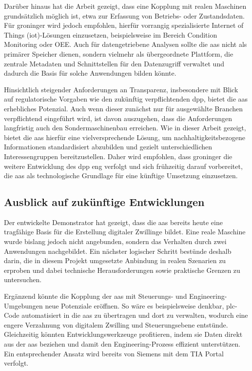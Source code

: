 Darüber hinaus hat die Arbeit gezeigt, dass eine Kopplung mit realen Maschinen grundsätzlich möglich ist, etwa zur Erfassung von Betriebs- oder Zustandsdaten. 
Für groninger wird jedoch empfohlen, hierfür vorrangig spezialisierte Internet of Things (\acs{iot})-Lösungen einzusetzen, beispielsweise im Bereich Condition Monitoring oder OEE.
Auch für datengetriebene Analysen sollte die \acs{aas} nicht als primärer Speicher dienen, sondern vielmehr als übergeordnete Plattform, die zentrale Metadaten und Schnittstellen für den Datenzugriff verwaltet und dadurch die Basis für solche Anwendungen bilden könnte.

Hinsichtlich steigender Anforderungen an Transparenz, insbesondere mit Blick auf regulatorische Vorgaben wie den zukünftig verpflichtenden \acs{dpp}, bietet die \acs{aas} erhebliches Potenzial. 
Auch wenn dieser zunächst nur für ausgewählte Branchen verpflichtend eingeführt wird, ist davon auszugehen, dass die Anforderungen langfristig auch den Sondermaschinenbau erreichen. 
Wie in dieser Arbeit gezeigt, bietet die \acs{aas} hierfür eine vielversprechende Lösung, um nachhaltigkeitsbezogene Informationen standardisiert abzubilden und gezielt unterschiedlichen Interessengruppen bereitzustellen. 
Daher wird empfohlen, dass 
\linebreak
groninger die weitere Entwicklung des \acs{dpp} eng verfolgt und sich frühzeitig darauf vorbereitet, die \acs{aas} als technologische Grundlage für eine künftige Umsetzung einzusetzen.

\subsection{Ausblick auf zukünftige Entwicklungen}
Der entwickelte Demonstrator hat gezeigt, dass die \acs{aas} bereits heute eine tragfähige Basis für die Erstellung digitaler Zwillinge bildet. 
Eine reale Maschine wurde bislang jedoch nicht angebunden, sondern das Verhalten durch zwei Anwendungen nachgebildet. 
Ein nächster logischer Schritt bestünde deshalb darin, die in diesem Projekt umgesetzte Anbindung in realen Szenarien zu erproben und dabei technische Herausforderungen sowie praktische Grenzen zu untersuchen. 

Ergänzend könnte die Kopplung der \acs{aas} mit Steuerungs- und Engineering-Umge\-bungen neue Potenziale eröffnen. 
So wäre es beispielsweise denkbar, \ac{plc}-Code automatisiert in die \acs{aas} zu übertragen und dort zu verwalten, wodurch eine engere Verzahnung von digitalem Zwilling und Steuerungsebene entstünde. 
Gleichzeitig könnten Entwicklungswerkzeuge profitieren, indem sie Daten direkt aus der \acs{aas} beziehen und damit den Engineering-Prozess effizient unterstützen. 
Ein entsprechender Ansatz wird bereits von Siemens mit dem TIA Portal verfolgt.

